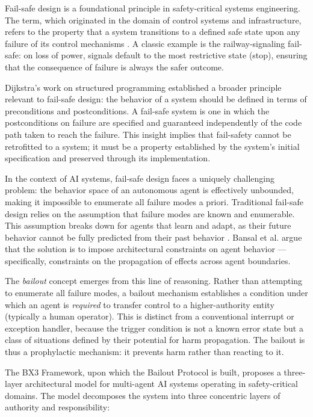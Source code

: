 Fail-safe design is a foundational principle in safety-critical systems engineering. The term, which originated in the domain of control systems and infrastructure, refers to the property that a system transitions to a defined safe state upon any failure of its control mechanisms \cite{tristr81}. A classic example is the railway-signaling fail-safe: on loss of power, signals default to the most restrictive state (stop), ensuring that the consequence of failure is always the safer outcome.

Dijkstra's work on structured programming \cite{dijkstra1982} established a broader principle relevant to fail-safe design: the behavior of a system should be defined in terms of preconditions and postconditions. A fail-safe system is one in which the postconditions on failure are specified and guaranteed independently of the code path taken to reach the failure. This insight implies that fail-safety cannot be retrofitted to a system; it must be a property established by the system's initial specification and preserved through its implementation.

In the context of AI systems, fail-safe design faces a uniquely challenging problem: the behavior space of an autonomous agent is effectively unbounded, making it impossible to enumerate all failure modes a priori. Traditional fail-safe design relies on the assumption that failure modes are known and enumerable. This assumption breaks down for agents that learn and adapt, as their future behavior cannot be fully predicted from their past behavior \cite{wiener1948}. Bansal et al. \cite{bansal2019} argue that the solution is to impose architectural constraints on agent behavior --- specifically, constraints on the propagation of effects across agent boundaries.

The \textit{bailout} concept emerges from this line of reasoning. Rather than attempting to enumerate all failure modes, a bailout mechanism establishes a condition under which an agent is \textit{required} to transfer control to a higher-authority entity (typically a human operator). This is distinct from a conventional interrupt or exception handler, because the trigger condition is not a known error state but a class of situations defined by their potential for harm propagation. The bailout is thus a prophylactic mechanism: it prevents harm rather than reacting to it.


The BX3 Framework, upon which the Bailout Protocol is built, proposes a three-layer architectural model for multi-agent AI systems operating in safety-critical domains. The model decomposes the system into three concentric layers of authority and responsibility:


